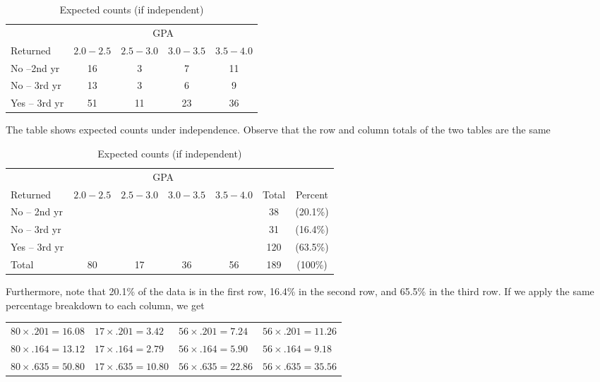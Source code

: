 \documentclass[11pt]{book}\usepackage[]{graphicx}\usepackage[]{color}
\begin{document}
\begin{table}[ht]
\centering
\caption{Expected counts (if independent)}
\begin{tabular}{@{} lcccc @{}} \hline
& \multicolumn{4}{c}{GPA} \\
Returned & $2.0-2.5$ & $2.5-3.0$ & $3.0-3.5$ & $3.5-4.0$ \\ \hline
No --2nd yr & 16 & 3 & 7 & 11 \\
No -- 3rd yr & 13 & 3 & 6 & 9 \\
Yes -- 3rd yr & 51 & 11 & 23 & 36 \\ \hline
\end{tabular}
\end{table}

The table shows expected counts under independence.  Observe that the row and column totals of the two tables are the same

\begin{table}[ht]
\centering
\caption{Expected counts (if independent)}
\begin{tabular}{@{} lcccccc @{}} \hline
& \multicolumn{4}{c}{GPA} \\
Returned & $2.0-2.5$ & $2.5-3.0$ & $3.0-3.5$ & $3.5-4.0$ & Total & Percent \\ \hline
No -- 2nd yr &  &  &  &  & 38 & (20.1\%) \\
No -- 3rd yr &  &  &  &  & 31 & (16.4\%)\\
Yes -- 3rd yr &  &  &  &  & 120 & (63.5\%) \\ \hline
Total        & 80 & 17 & 36 & 56 & 189 & (100\%) \\
\end{tabular}
\end{table}

Furthermore, note that 20.1\% of the data is in the first row, 16.4\% in the second row, and 65.5\% in the third row.  If we apply the same percentage breakdown to each column, we get

\begin{table}[ht]
\centering
\begin{tabular}{@{} llll @{}} \hline
$80 \times .201 = 16.08$ & $17 \times .201 = 3.42$ & $56 \times .201 = 7.24$ & $56 \times .201 = 11.26$  \\
$80 \times .164 = 13.12$ & $17 \times .164 = 2.79$ & $56 \times .164 = 5.90$ & $56 \times .164 = 9.18$  \\
$80 \times .635 = 50.80$ & $17 \times .635 = 10.80$ & $56 \times .635 = 22.86$ & $56 \times .635 = 35.56$  \\ \hline
\end{tabular}
\end{table}
\end{document}
